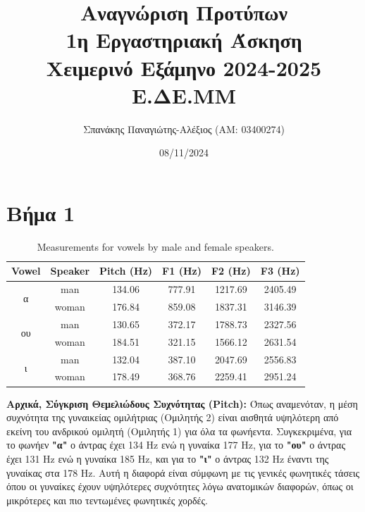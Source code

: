 \documentclass[a4paper,12pt]{article}
\title{Αναγνώριση Προτύπων \\ 1η Εργαστηριακή Άσκηση \\ Χειμερινό Εξάμηνο 2024-2025 \\ Ε.ΔE.ΜΜ}
\author{Σπανάκης Παναγιώτης-Αλέξιος (ΑΜ: 03400274)}
\date{08/11/2024}
\begin{document}
\maketitle
\section*{Βήμα 1}

\begin{table}[h!]
    \centering
    \begin{tabular}{|c|c|c|c|c|c|}
        \hline
        \textbf{Vowel}      & \textbf{Speaker} & \textbf{Pitch (Hz)} & \textbf{F1 (Hz)} & \textbf{F2 (Hz)} & \textbf{F3 (Hz)} \\ \hline
        \multirow{2}{*}{α}  & man              & 134.06              & 777.91           & 1217.69          & 2405.49          \\ \cline{2-6}
                            & woman            & 176.84              & 859.08           & 1837.31          & 3146.39          \\ \hline
        \multirow{2}{*}{ου} & man              & 130.65              & 372.17           & 1788.73          & 2327.56          \\ \cline{2-6}
                            & woman            & 184.51              & 321.15           & 1566.12          & 2631.54          \\ \hline
        \multirow{2}{*}{ι}  & man              & 132.04              & 387.10           & 2047.69          & 2556.83          \\ \cline{2-6}
                            & woman            & 178.49              & 368.76           & 2259.41          & 2951.24          \\ \hline
    \end{tabular}
    \caption{Measurements for vowels by male and female speakers.}
    \label{tab:vowels}
\end{table}

\textbf{Αρχικά, Σύγκριση Θεμελιώδους Συχνότητας (Pitch):}
Όπως αναμενόταν, η μέση συχνότητα της γυναικείας ομιλήτριας (Ομιλητής 2) είναι αισθητά υψηλότερη από εκείνη του ανδρικού ομιλητή (Ομιλητής 1)
για όλα τα φωνήεντα. Συγκεκριμένα, για το φωνήεν \textbf{"α"} ο άντρας έχει 134 Hz ενώ η γυναίκα 177 Hz, για το \textbf{"ου"} ο
άντρας έχει 131 Hz ενώ η γυναίκα 185 Hz, και για το \textbf{"ι"} ο άντρας 132 Hz έναντι της γυναίκας στα 178 Hz.
Αυτή η διαφορά είναι σύμφωνη με τις γενικές φωνητικές τάσεις όπου οι γυναίκες έχουν υψηλότερες συχνότητες λόγω ανατομικών διαφορών,
όπως οι μικρότερες και πιο τεντωμένες φωνητικές χορδές.
\end{document}
